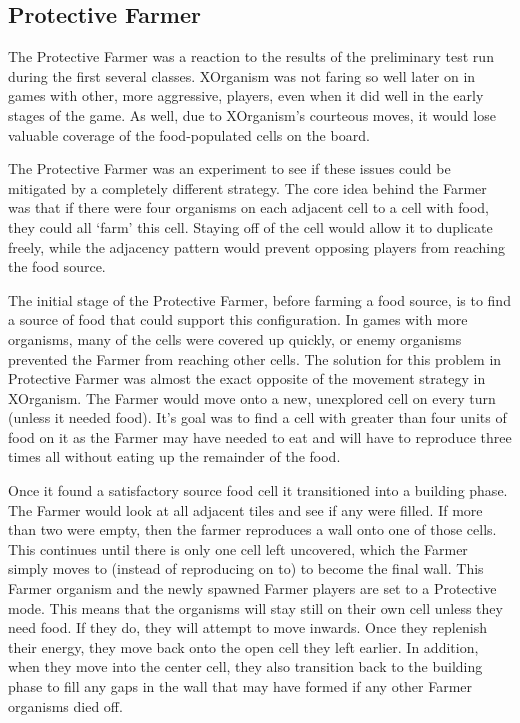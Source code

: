 \documentclass[
10pt, %
letterpaper, %
oneside, %
headinclude,footinclude, %
english
]{article}
\begin{document}
\subsection{Protective Farmer}
The Protective Farmer was a reaction to the results of the preliminary test run during the first several classes. XOrganism was not faring so well later on in games with other, more aggressive, players, even when it did well in the early stages of the game. As well, due to XOrganism's courteous moves, it would lose valuable coverage of the food-populated cells on the board.

The Protective Farmer was an experiment to see if these issues could be mitigated by a completely different strategy. The core idea behind the Farmer was that if there were four organisms on each adjacent cell to a cell with food, they could all `farm' this cell. Staying off of the cell would allow it to duplicate freely, while the adjacency pattern would prevent opposing players from reaching the food source.

The initial stage of the Protective Farmer, before farming a food source, is to find a source of food that could support this configuration. In games with more organisms, many of the cells were covered up quickly, or enemy organisms prevented the Farmer from reaching other cells. The solution for this problem in Protective Farmer was almost the exact opposite of the movement strategy in XOrganism. The Farmer would move onto a new, unexplored cell on every turn (unless it needed food). It's goal was to find a cell with greater than four units of food on it as the Farmer may have needed to eat and will have to reproduce three times all without eating up the remainder of the food.

Once it found a satisfactory source food cell it transitioned into a building phase. The Farmer would look at all adjacent tiles and see if any were filled. If more than two were empty, then the farmer reproduces a wall onto one of those cells. This continues until there is only one cell left uncovered, which the Farmer simply moves to (instead of reproducing on to) to become the final wall. This Farmer organism and the newly spawned Farmer players are set to a Protective mode. This means that the organisms will stay still on their own cell unless they need food. If they do, they will attempt to move inwards. Once they replenish their energy, they move back onto the open cell they left earlier. In addition, when they move into the center cell, they also transition back to the building phase to fill any gaps in the wall that may have formed if any other Farmer organisms died off.
\end{document}
